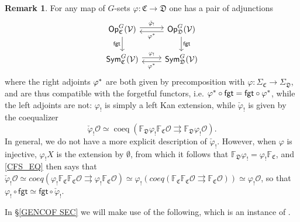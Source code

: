 \documentclass[a4paper,10pt
,draft
]{article}%
\numberwithin{equation}{section}
\numberwithin{figure}{section}
\theoremstyle{definition} %
\newtheorem{remark}[equation]{Remark}%
\newcommand{\Sym}{\ensuremath{\mathsf{Sym}}}%
\newcommand{\Op}{\mathsf{Op}}%
\newcommand{\V}{\ensuremath{\mathcal V}}
\renewcommand{\O}{\ensuremath{\mathcal O}}
\newcommand{\1}{\ensuremath{\mathbbm 1}}%
\begin{document}
\begin{remark}\label{OP_MAP REM}
	For any map of $G$-sets 
	$\varphi \colon \mathfrak C \to \mathfrak D$
	one has a pair of adjunctions
	\begin{equation}\label{GC_CHANGE_EQ}
	\begin{tikzcd}
	\Op^G_{\mathfrak C}(\V) 
	\arrow[shift left]{r}{\check{\varphi}_!}
	\arrow[d, "\mathsf{fgt}"']
	&
	\Op^G_{\mathfrak D}(\V) 
	\arrow[shift left]{l}{\varphi^{\**}}
	\arrow[d, "\mathsf{fgt}"]
	\\
	\Sym^G_{\mathfrak C}(\V) 
	\arrow[shift left]{r}{\varphi_!}
	&
	\Sym^G_{\mathfrak D}(\V) 
	\arrow[shift left]{l}{\varphi^{\**}}
	\end{tikzcd}
	\end{equation}
	where the right adjoints $\varphi^{\**}$ are
	both given by precomposition with
	$\varphi \colon 
	\Sigma_{\mathfrak{C}} \to \Sigma_{\mathfrak{D}}$,
	and are thus compatible with the forgetful functors, 
	i.e. $\varphi^{\**} \circ \mathsf{fgt} = 
	\mathsf{fgt} \circ \varphi^{\**}$, 
	while the left adjoints are not:
	$\varphi_!$ is simply a left Kan extension, while $\check{\varphi}_!$ is given by the coequalizer
	\begin{equation}\label{CFS_EQ}
	\check{\varphi}_! \O \simeq \mathop{coeq}(\mathbb F_{\mathfrak D} \varphi_! \mathbb F_{\mathfrak C}\O \rightrightarrows \mathbb F_{\mathfrak D} \varphi_! \O).
	\end{equation}
	In general, we do not have a more explicit description of $\check{\varphi}_!$.
	However, when $\varphi$ is injective, 
	$\varphi_!X$ is the extension by $\emptyset$,
	from which it follows that 
	$\mathbb F_{\mathfrak D} \varphi_! = \varphi_! \mathbb F_{\mathfrak C}$,
	and \eqref{CFS_EQ}
	then says that
	$\check{\varphi}_! \O
	\simeq
	coeq \left( \varphi_! \mathbb{F}_{\mathfrak{C}}  \mathbb{F}_{\mathfrak{C}} \O
	\rightrightarrows 
	\varphi_!  \mathbb{F}_{\mathfrak{C}} \O
	\right)
	\simeq 
	\varphi_! \left( coeq \left( 
	\mathbb{F}_{\mathfrak{C}}  \mathbb{F}_{\mathfrak{C}} \O
	\rightrightarrows 
	\mathbb{F}_{\mathfrak{C}} \O
	\right) \right)
	\simeq 
	\varphi_! \O$,
	so that  	
	$\varphi_! \circ \mathsf{fgt} \simeq 
	\mathsf{fgt} \circ \check{\varphi}_!$.
\end{remark}


In \S \ref{GENCOF SEC} we will make use of the following,
which is an instance of 
\cite[Rem. \ref{OC-LIMINFIBSUP REM}]{BP_FCOP}.
\end{document}
